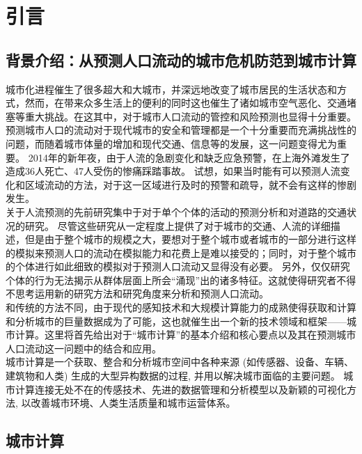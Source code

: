 
\chapter{引言} %
\label{Chapter1} %
\section{背景介绍：从预测人口流动的城市危机防范到城市计算}
城市化进程催生了很多超大和大城市，并深远地改变了城市居民的生活状态和方式，然而，在带来众多生活上的便利的同时这也催生了诸如城市空气恶化、交通堵塞等重大挑战。在这其中，对于城市人口流动的管控和风险预测也显得十分重要。
预测城市人口的流动对于现代城市的安全和管理都是一个十分重要而充满挑战性的问题，而随着城市体量的增加和现代交通、信息等的发展，这一问题变得尤为重要。 2014年的新年夜，由于人流的急剧变化和缺乏应急预警，在上海外滩发生了造成36人死亡、47人受伤的惨痛踩踏事故\cite{hoang2016fccf:}。 试想，如果当时能有可以预测人流变化和区域流动的方法，对于这一区域进行及时的预警和疏导，就不会有这样的惨剧发生。\\
\indent 关于人流预测的先前研究集中于对于单个个体的活动的预测分析\cite{ye2009mining,zheng2012an}和对道路的交通状况的研究\cite{shang2014inferring,wang2014travel}。 尽管这些研究从一定程度上提供了对于城市的交通、人流的详细描述，但是由于整个城市的规模之大，要想对于整个城市或者城市的一部分进行这样的模拟来预测人口的流动在模拟能力和花费上是难以接受的；同时，对于整个城市的个体进行如此细致的模拟对于预测人口流动又显得没有必要。 另外，仅仅研究个体的行为无法揭示从群体层面上所会“涌现”出的诸多特征。这就使得研究者不得不思考运用新的研究方法和研究角度来分析和预测人口流动。\\
\indent 和传统的方法不同，由于现代的感知技术和大规模计算能力的成熟使得获取和计算和分析城市的巨量数据成为了可能，这也就催生出一个新的技术领域和框架——城市计算。这里将首先给出对于“城市计算”的基本介绍和核心要点以及其在预测城市人口流动这一问题中的结合和应用。\\
\indent 城市计算是一个获取、整合和分析城市空间中各种来源 (如传感器、设备、车辆、建筑物和人类) 生成的大型异构数据的过程, 并用以解决城市面临的主要问题\cite{zheng2014urban}。 城市计算连接无处不在的传感技术、先进的数据管理和分析模型以及新颖的可视化方法, 以改善城市环境、人类生活质量和城市运营体系。
\section{城市计算}
